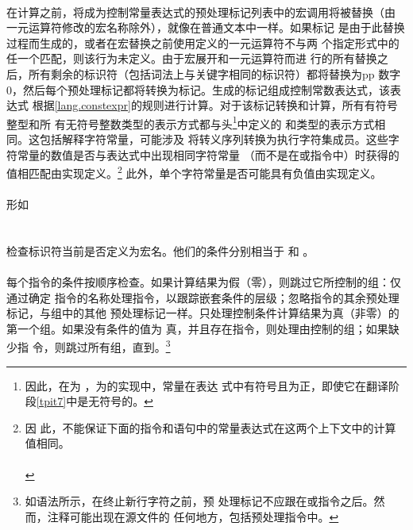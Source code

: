 {\paragraph{}
在计算之前，将成为控制常量表达式的预处理标记列表中的宏调用将被替换（由
一元运算符修改的宏名称除外），就像在普通文本中一样。如果标记
是由于此替换过程而生成的，或者在宏替换之前使用定义的一元运算符不与两
个指定形式中的任一个匹配，则该行为未定义。由于宏展开和一元运算符而进
行的所有替换之后，所有剩余的标识符（包括词法上与关键字相同的标识符）都将替换为pp
数字0，然后每个预处理标记都将转换为标记。生成的标记组成控制常数表达式，该表达式
根据\ref{lang.constexpr}的规则进行计算。对于该标记转换和计算，所有有符号整型和所
有无符号整数类型的表示方式都与头\footnote{因此，在为
，为的实现中，常量在表达
式中有符号且为正，即使它在翻译阶段\ref{tpit7}中是无符号的。}中定义的
和类型的表示方式相同。这包括解释字符常量，可能涉及
将转义序列转换为执行字符集成员。这些字符常量的数值是否与表达式中出现相同字符常量
（而不是在或指令中）时获得的值相匹配由实现定义。\footnote{因
此，不能保证下面的指令和语句中的常量表达式在这两个上下文中的计算
值相同。                                                                      \\
\mbox{\hspace{4em}}                                  \\
\mbox{\hspace{4em}}
} 此外，单个字符常量是否可能具有负值由实现定义。

\paragraph{}
形如                                                                          \\
\mbox{} \\
\mbox{}  \\
检查标识符当前是否定义为宏名。他们的条件分别相当于
和 。

\paragraph{}
每个指令的条件按顺序检查。如果计算结果为假（零），则跳过它所控制的组：仅通过确定
指令的名称处理指令，以跟踪嵌套条件的层级；忽略指令的其余预处理标记，与组中的其他
预处理标记一样。只处理控制条件计算结果为真（非零）的第一个组。如果没有条件的值为
真，并且存在指令，则处理由控制的组；如果缺少指
令，则跳过所有组，直到。\footnote{如语法所示，在终止新行字符之前，预
处理标记不应跟在或指令之后。然而，注释可能出现在源文件的
任何地方，包括预处理指令中。}

}

